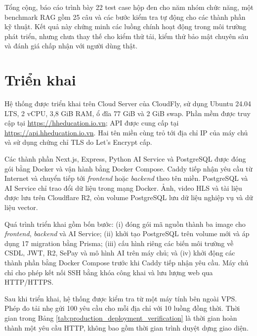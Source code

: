 \documentclass[../DoAn.tex]{subfiles}
\begin{document}
Tổng cộng, báo cáo trình bày 22 test case hộp đen cho năm nhóm chức năng, một benchmark RAG gồm 25 câu và các bước kiểm tra tự động cho các thành phần kỹ thuật. Kết quả này chứng minh các luồng chính hoạt động trong môi trường phát triển, nhưng chưa thay thế cho kiểm thử tải, kiểm thử bảo mật chuyên sâu và đánh giá chấp nhận với người dùng thật.

\section{Triển khai}
Hệ thống được triển khai trên Cloud Server của CloudFly, sử dụng Ubuntu 24.04 LTS, 2 vCPU, 3,8 GiB RAM, ổ đĩa 77 GiB và 2 GiB swap. Phần mềm được truy cập tại \url{https://hheducation.io.vn}; API được cung cấp tại \url{https://api.hheducation.io.vn}. Hai tên miền cùng trỏ tới địa chỉ IP của máy chủ và sử dụng chứng chỉ TLS do Let's Encrypt cấp.

Các thành phần Next.js, Express, Python AI Service và PostgreSQL được đóng gói bằng Docker và vận hành bằng Docker Compose. Caddy tiếp nhận yêu cầu từ Internet và chuyển tiếp tới \textit{frontend} hoặc \textit{backend} theo tên miền. PostgreSQL và AI Service chỉ trao đổi dữ liệu trong mạng Docker. Ảnh, video HLS và tài liệu được lưu trên Cloudflare R2, còn volume PostgreSQL lưu dữ liệu nghiệp vụ và dữ liệu vector.

Quá trình triển khai gồm bốn bước: (i) đóng gói mã nguồn thành ba image cho \textit{frontend}, \textit{backend} và AI Service; (ii) khởi tạo PostgreSQL trên volume mới và áp dụng 17 migration bằng Prisma; (iii) cấu hình riêng các biến môi trường về CSDL, JWT, R2, SePay và mô hình AI trên máy chủ; và (iv) khởi động các thành phần bằng Docker Compose trước khi Caddy tiếp nhận yêu cầu. Máy chủ chỉ cho phép kết nối SSH bằng khóa công khai và lưu lượng web qua HTTP/HTTPS.

Sau khi triển khai, hệ thống được kiểm tra từ một máy tính bên ngoài VPS. Phép đo tải nhẹ gửi 100 yêu cầu cho mỗi địa chỉ với 10 luồng đồng thời. Thời gian trong Bảng \ref{tab:production_deployment_verification} là thời gian hoàn thành một yêu cầu HTTP, không bao gồm thời gian trình duyệt dựng giao diện.
\end{document}
